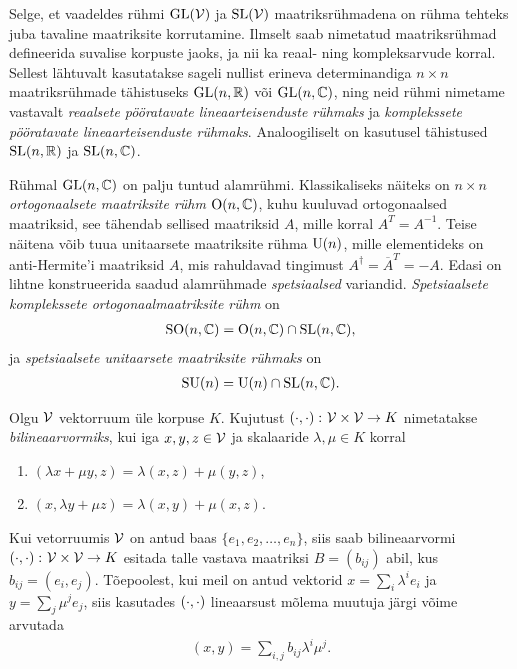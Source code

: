 Selge, et vaadeldes rühmi $\operatorname{GL}(\mathcal{V})$ ja $\operatorname{SL}(\mathcal{V})$ maatriksrühmadena
on rühma tehteks juba tavaline maatriksite korrutamine. Ilmselt saab
nimetatud maatriksrühmad defineerida suvalise korpuste jaoks, ja nii ka
reaal- ning kompleksarvude korral. Sellest lähtuvalt kasutatakse sageli
nullist erineva determinandiga $n \times n$ maatriksrühmade tähistuseks
$\operatorname{GL}(n, \mathbb{R})$ või $\operatorname{GL}(n, \mathbb{C})$, ning neid rühmi nimetame vastavalt
\emph{reaalsete pööratavate lineaarteisenduste rühmaks} ja \emph{komplekssete
pööratavate lineaarteisenduste rühmaks}. Analoogiliselt on kasutusel
tähistused $\operatorname{SL}(n, \mathbb{R})$ ja $\operatorname{SL}(n, \mathbb{C})$.

Rühmal $\operatorname{GL}(n, \mathbb{C})$ on palju tuntud alamrühmi. Klassikaliseks näiteks on
$n \times n$ \emph{ortogonaalsete maatriksite rühm} $\operatorname{O}(n, \mathbb{C})$, kuhu kuuluvad
ortogonaalsed maatriksid, see tähendab sellised maatriksid $A$, mille korral
$A^T = A^{-1}$. Teise näitena võib tuua unitaarsete maatriksite rühma $\operatorname{U}(n)$,
mille elementideks on anti-Hermite'i maatriksid $A$, mis rahuldavad tingimust
$A^\dag = \overline{A}^T = -A$. Edasi on lihtne konstrueerida saadud alamrühmade
\emph{spetsiaalsed} variandid. \emph{Spetsiaalsete komplekssete ortogonaalmaatriksite rühm} on
\begin{align*}
    \operatorname{SO}(n, \mathbb{C}) = \operatorname{O}(n, \mathbb{C}) \cap \operatorname{SL}(n, \mathbb{C}),
\end{align*}
ja \emph{spetsiaalsete unitaarsete maatriksite rühmaks} on
\begin{align*}
    \operatorname{SU}(n) = \operatorname{U}(n) \cap \operatorname{SL}(n, \mathbb{C}).
\end{align*}

\begin{dfn}
    Olgu $\mathcal{V}$ vektorruum üle korpuse $K$. Kujutust
    $\left( \cdot, \cdot \right) \colon \mathcal{V} \times \mathcal{V} \to K$
    nimetatakse \emph{bilineaarvormiks}, kui iga $x, y, z \in \mathcal{V}$
    ja skalaaride $\lambda, \mu \in K$ korral
    \begin{enumerate}[label=\roman*.]
        \item $(\lambda x + \mu y, z) = \lambda (x, z) + \mu (y, z)$,
        \item $(x, \lambda y + \mu z) = \lambda (x, y) + \mu (x, z)$.
    \end{enumerate}
\end{dfn}

Kui vetorruumis $\mathcal{V}$ on antud baas $\{e_1, e_2, \dots, e_n\}$, siis saab
bilineaarvormi $\left( \cdot, \cdot \right) \colon \mathcal{V} \times \mathcal{V} \to K$ esitada talle vastava maatriksi
$B = (b_{ij})$ abil, kus $b_{ij} = (e_i, e_j)$. Tõepoolest, kui
meil on antud vektorid $x = \sum_i \lambda^i e_i$ ja $y = \sum_j \mu^j e_j$,
siis kasutades $\left( \cdot, \cdot \right)$ lineaarsust mõlema muutuja järgi võime arvutada
\begin{align*}
    (x, y) = \sum_{i, j} b_{ij} \lambda^i \mu^j.
\end{align*}

